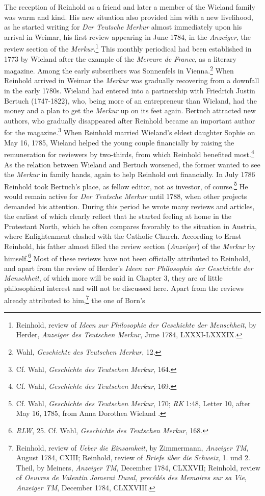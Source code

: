 The reception of Reinhold as a friend and later a member of the Wieland family was warm and kind. His new situation also provided him with a new livelihood, as he started writing for \textit{Der Teutsche Merkur} almost immediately upon his arrival in Weimar, his first review appearing in June 1784, in the \textit{Anzeiger}, the review section of the \textit{Merkur}.\footnote{ Reinhold, review of \textit{Ideen zur Philosophie der Geschichte der Menschheit}, by Herder, \textit{Anzeiger des Teutschen Merkur}, June 1784, LXXXI{-}LXXXIX.} This monthly periodical had been established in 1773 by Wieland after the example of the \textit{Mercure de France}, as a literary magazine. Among the early subscribers was Sonnenfels in Vienna.\footnote{ Wahl, \textit{Geschichte des Teutschen Merkur}, 12.} When Reinhold arrived in Weimar the \textit{Merkur} was gradually recovering from a downfall in the early 1780s. Wieland had entered into a partnership with Friedrich Justin Bertuch (1747{-}1822), who, being more of an entrepreneur than Wieland, had the money and a plan to get the \textit{Merkur} up on its feet again. Bertuch attracted new authors, who gradually disappeared after Reinhold became an important author for the magazine.\footnote{ Cf. Wahl, \textit{Geschichte des Teutschen Merkur}, 164.} When Reinhold married Wieland's eldest daughter Sophie on May 16, 1785, Wieland helped the young couple financially by raising the remuneration for reviewers by two{-}thirds, from which Reinhold benefited most.\footnote{ Cf. Wahl, \textit{Geschichte des Teutschen Merkur}, 169.} As the relation between Wieland and Bertuch worsened, the former wanted to see the \textit{Merkur} in family hands, again to help Reinhold out financially. In July 1786 Reinhold took Bertuch's place, as fellow editor, not as investor, of course.\footnote{ Cf. Wahl, \textit{Geschichte des Teutschen Merkur}, 170; \textit{RK} 1:48, Letter 10, after May 16, 1785, from Anna Dorothea Wieland .} He would remain active for \textit{Der Teutsche Merkur} until 1788, when other projects demanded his attention. During this period he wrote many reviews and articles, the earliest of which clearly reflect that he started feeling at home in the Protestant North, which he often compares favorably to the situation in Austria, where Enlightenment clashed with the Catholic Church. According to Ernst Reinhold, his father almost filled the review section (\textit{Anzeiger}) of the \textit{Merkur} by himself.\footnote{ \textit{RLW}, 25. Cf. Wahl, \textit{Geschichte des Teutschen Merkur}, 168.} Most of these reviews have not been officially attributed to Reinhold, and apart from the review of Herder's \textit{Ideen zur Philosophie der Geschichte der Menschheit}, of which more will be said in Chapter 3, they are of little philosophical interest and will not be discussed here. Apart from the reviews already attributed to him,\footnote{ Reinhold, review of \textit{Ueber die Einsamkeit}, by Zimmermann, \textit{Anzeiger TM}, August 1784, CXIII; Reinhold, review of \textit{Briefe \"{u}ber die Schweiz}, 1. und 2. Theil, by Meiners, \textit{Anzeiger TM}, December 1784, CLXXVII; Reinhold, review of \textit{Oeuvres de Valentin Jamerai Duval, prec\'{e}d\'{e}s des Memoires sur sa Vie}, \textit{Anzeiger TM}, December 1784, CLXXVIII.} the one of Born's 
